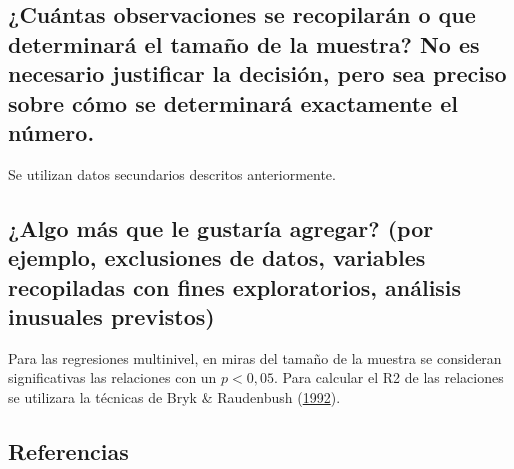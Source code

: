 \documentclass[
  12pt,
]{article}
\begin{document}
\hypertarget{cuuxe1ntas-observaciones-se-recopilaruxe1n-o-que-determinaruxe1-el-tamauxf1o-de-la-muestra-no-es-necesario-justificar-la-decisiuxf3n-pero-sea-preciso-sobre-cuxf3mo-se-determinaruxe1-exactamente-el-nuxfamero.}{%
\subsection{¿Cuántas observaciones se recopilarán o que determinará el
tamaño de la muestra? No es necesario justificar la decisión, pero sea
preciso sobre cómo se determinará exactamente el
número.}\label{cuuxe1ntas-observaciones-se-recopilaruxe1n-o-que-determinaruxe1-el-tamauxf1o-de-la-muestra-no-es-necesario-justificar-la-decisiuxf3n-pero-sea-preciso-sobre-cuxf3mo-se-determinaruxe1-exactamente-el-nuxfamero.}}

Se utilizan datos secundarios descritos anteriormente.

\hypertarget{algo-muxe1s-que-le-gustaruxeda-agregar-por-ejemplo-exclusiones-de-datos-variables-recopiladas-con-fines-exploratorios-anuxe1lisis-inusuales-previstos}{%
\subsection{¿Algo más que le gustaría agregar? (por ejemplo, exclusiones
de datos, variables recopiladas con fines exploratorios, análisis
inusuales
previstos)}\label{algo-muxe1s-que-le-gustaruxeda-agregar-por-ejemplo-exclusiones-de-datos-variables-recopiladas-con-fines-exploratorios-anuxe1lisis-inusuales-previstos}}

Para las regresiones multinivel, en miras del tamaño de la muestra se
consideran significativas las relaciones con un \(p< 0,05\). Para
calcular el R2 de las relaciones se utilizara la técnicas de Bryk \&
Raudenbush (\protect\hyperlink{ref-bryk_Hierarchical_1992}{1992}).

\pagebreak

\hypertarget{referencias}{%
\subsection*{Referencias}\label{referencias}}
\end{document}
